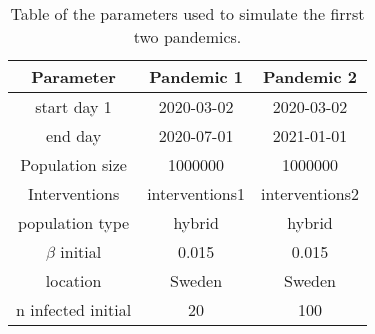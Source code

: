 \begin{table}[htbp]
    \centering
    \caption{Table of the parameters used to simulate the firrst two pandemics.}
    \label{tab:parameters_covasim}
    \begin{tabular}{|c|c|c|}
        \hline
        \textbf{Parameter} & \textbf{Pandemic 1} & \textbf{ Pandemic 2} \\
        \hline
        start day 1 &2020-03-02 & 2020-03-02\\
        \hline

        end day  &2020-07-01 & 2021-01-01\\
        \hline

        Population size &1000000&1000000\\
        \hline

        Interventions & interventions1 & interventions2\\
        \hline

        population type& hybrid & hybrid\\

        \hline

        $\beta$ initial &0.015 & 0.015\\
        \hline

        location & Sweden & Sweden \\
        \hline

        n infected initial &20&100\\
        \hline
    \end{tabular}
\end{table}
